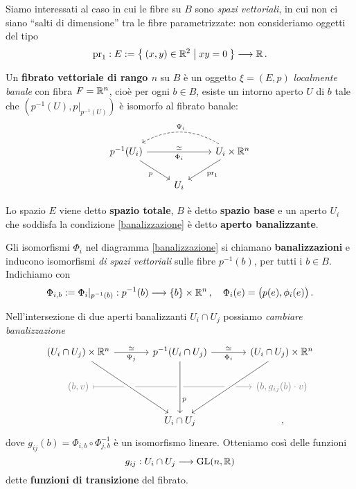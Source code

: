 Siamo interessati al caso in cui le fibre su $B$ sono \emph{spazi vettoriali},
in cui non ci siano ``salti di dimensione'' tra le fibre parametrizzate:
non consideriamo oggetti del tipo
\begin{equation*}
	\mathrm{pr}_{1} : E := \Set{(x,y) \in {\mathbb R}^{2} | xy=0} \longrightarrow {\mathbb R}\,.
\end{equation*}

\begin{df}
	Un \textbf{fibrato vettoriale di rango $n$} su $B$ è un oggetto 
	$\xi=(E,p)$ \emph{localmente banale} con fibra $F={\mathbb R}^{n}$,
	cioè per ogni $b \in B$, esiste un intorno aperto $U$ di $b$ tale che
	$\left( p^{-1}(U) , p\vert_{p^{-1}(U)} \right)$
	è isomorfo al fibrato banale:
	\begin{equation}\label{banalizzazione}
		\begin{tikzcd}
			p^{-1}(U_{i}) \ar[rr, "\Phi_{i}"', "\simeq"] \ar[dr, "p"'] 
			& & U_{i} \times \R^{n} \ar[dl, "\mathrm{pr}_{1}"] 
			\ar[ll, bend right, "\Psi_{i}"', dashed] \\
			& U_{i} &
		\end{tikzcd}
	\end{equation}
	
	Lo spazio $E$ viene detto \textbf{spazio totale}, $B$ è detto \textbf{spazio base}
	e un aperto $U_{i}$ che soddisfa la condizione \eqref{banalizzazione} è detto
	\textbf{aperto banalizzante}.
\end{df}

Gli isomorfismi $\Phi_{i}$ nel diagramma \eqref{banalizzazione} si
chiamano \textbf{banalizzazioni} e inducono isomorfismi 
\emph{di spazi vettoriali} sulle fibre $p^{-1}(b)$, per tutti i $b \in B$.
Indichiamo con
\begin{equation*}
	\Phi_{i,b} := \Phi_{i}\vert_{p^{-1}(b)} : p^{-1}(b) \longrightarrow \{b\} \times \R^{n}\,,
	\quad \Phi_{i}(e) = \big( p(e), \phi_{i}(e) \big)\,.
\end{equation*}

Nell'intersezione di due aperti banalizzanti $U_{i} \cap U_{j}$ possiamo
\emph{cambiare banalizzazione}
\begin{equation*}
	\begin{tikzcd}[column sep=large]
		(U_{i} \cap U_{j}) \times \R^n  \ar[r, "\Psi_{j}"', "\simeq"]
            & p^{-1}(U_{i} \cap U_{j}) \ar[r, "\Phi_{i}"', "\simeq"]
            & (U_{i} \cap U_{j}) \times \R^n \\
            \textcolor{black!50}{(b, v)} \ar[rr, mapsto, black!50] 
            & & \textcolor{black!50}{(b, g_{ij}(b) \cdot v)} \\
            & U_{i} \cap U_{j} \ar[from=uu, crossing over, "p",  near end] 
            \ar[from=uul, crossing over] \ar[from=uur, crossing over]
            & \,,
	\end{tikzcd}
\end{equation*}
dove $g_{ij}(b) = \Phi_{i,b} \circ \Phi_{j,b}^{-1}$ è un isomorfismo lineare.
Otteniamo così delle funzioni
\begin{equation*}
	g_{ij} : U_{i} \cap U_{j} \longrightarrow \mathrm{GL}(n,{\mathbb R})
\end{equation*}
dette \textbf{funzioni di transizione} del fibrato.

